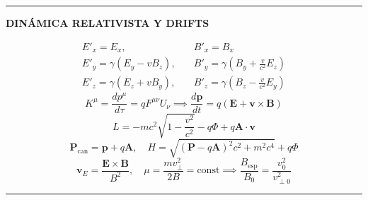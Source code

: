 \documentclass[twocolumn]{article}
\begin{document}
	\vspace{-2mm}\hrule\vspace{1mm}
	
	\begin{center}\textbf{\footnotesize DINÁMICA RELATIVISTA Y DRIFTS}\end{center}
	\vspace{-2mm}
	\begin{align*}
		E'_x = E_x, & \quad B'_x = B_x \\
		E'_y = \gamma(E_y - v B_z), & \quad B'_y = \gamma\left(B_y + \frac{v}{c^2}E_z\right) \\
		E'_z = \gamma(E_z + v B_y), & \quad B'_z = \gamma\left(B_z - \frac{v}{c^2}E_y\right)
	\end{align*}
	\begin{equation*}
		K^\mu = \frac{dp^\mu}{d\tau} = q F^{\mu\nu}U_\nu \implies \frac{d\mathbf{p}}{dt} = q(\mathbf{E} + \mathbf{v}\times\mathbf{B})
	\end{equation*}
	\begin{equation*}
		L = -mc^2\sqrt{1 - \frac{v^2}{c^2}} - q\Phi + q\mathbf{A}\cdot\mathbf{v}
	\end{equation*}
	\begin{equation*}
		\mathbf{P}_{\text{can}} = \mathbf{p} + q\mathbf{A}, \quad H = \sqrt{(\mathbf{P} - q\mathbf{A})^2 c^2 + m^2 c^4} + q\Phi
	\end{equation*}
	\begin{equation*}
		\mathbf{v}_E = \frac{\mathbf{E}\times\mathbf{B}}{B^2}, \quad \mu = \frac{m v_\perp^2}{2B} = \text{const} \implies \frac{B_{\text{esp}}}{B_0} = \frac{v_0^2}{v_{\perp 0}^2}
	\end{equation*}
	
	\vspace{-2mm}\hrule\vspace{1mm}
	
\end{document}
